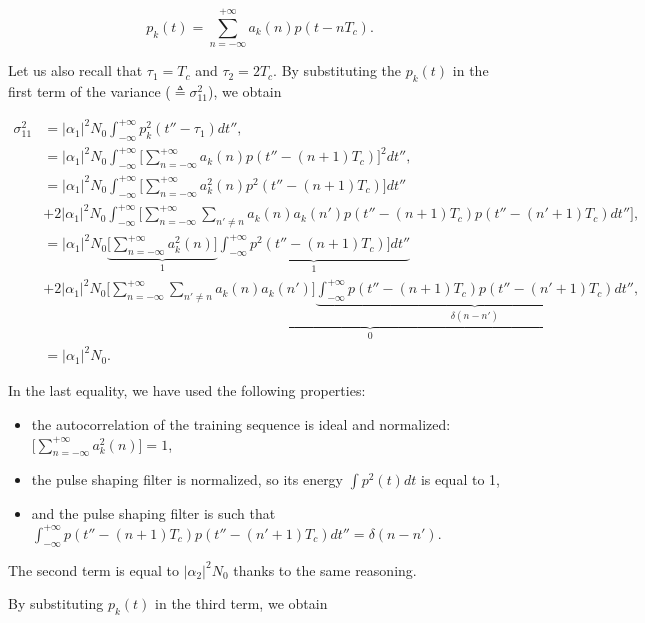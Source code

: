 \documentclass [a4paper, 11pt] {article}
\begin{document}
\begin{solution}
\begin{enumerate}
\begin{equation}
    p_k(t) = \sum_{n=-\infty}^{+\infty}a_k(n)p(t-nT_c).
\end{equation}

Let us also recall that $\tau_1 = T_c$ and $\tau_2 = 2T_c$.
By substituting the $p_k(t)$ in the first term of the variance ($\triangleq\sigma_{11}^2$), we obtain 

\begin{align}
    \sigma_{11}^2 &=|\alpha_1|^2N_0 \int_{-\infty}^{+\infty}p_k^2(t''-\tau_{1})dt'', \\
    &= |\alpha_1|^2N_0 \int_{-\infty}^{+\infty}\Big[ \sum_{n=-\infty}^{+\infty}a_k(n)p(t''- (n+1)T_c) \Big]^2 dt'',\\
    &= |\alpha_1|^2N_0 \int_{-\infty}^{+\infty}\Big[ \sum_{n=-\infty}^{+\infty}a^2_k(n)p^2(t''- (n+1)T_c) \Big] dt'' \\
    &+ 2|\alpha_1|^2N_0 \int_{-\infty}^{+\infty}\Big[\sum_{n=-\infty}^{+\infty}\sum_{n'\neq n}a_k(n)a_k(n')p(t''- (n+1)T_c) p(t''- (n'+1)T_c) dt''\Big] \nonumber,\\
    &= |\alpha_1|^2N_0 \underbrace{\Big[ \sum_{n=-\infty}^{+\infty}a^2_k(n) \Big]}_{1} \underbrace{\int_{-\infty}^{+\infty} p^2(t''- (n+1)T_c) \Big] dt''}_{1} \\
    &+ 2|\alpha_1|^2N_0 \underbrace{\Big[\sum_{n=-\infty}^{+\infty}\sum_{n'\neq n}a_k(n)a_k(n') \Big] \underbrace{\int_{-\infty}^{+\infty} p(t''- (n+1)T_c) p(t''- (n'+1)T_c) dt''}_{\delta(n-n')}}_{0}\nonumber,\\
    &= |\alpha_1|^2N_0.
\end{align}

In the last equality, we have used the following properties:  

\begin{itemize}
    \item the autocorrelation of the training sequence is ideal and normalized: $\big[ \sum_{n=-\infty}^{+\infty}a^2_k(n)\big] = 1$,
    \item the pulse shaping filter is normalized, so its energy $\int p^2(t) dt$ is equal to 1,
    \item and the pulse shaping filter is such that $\int_{-\infty}^{+\infty} p(t''- (n+1)T_c) p(t''- (n'+1)T_c) dt'' = \delta(n-n')$.
\end{itemize}

The second term is equal to $|\alpha_2|^2N_0$ thanks to the same reasoning. 

By substituting $p_k(t)$ in the third term, we obtain 


\end{enumerate}
\end{solution}
\end{document}
